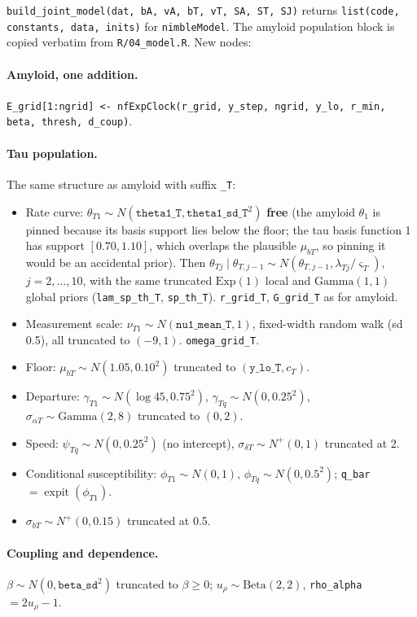 \documentclass[11pt]{article}
\newcommand{\code}[1]{\texttt{#1}}
\newcommand{\expit}{\operatorname{expit}}
\begin{document}
\code{build\_joint\_model(dat, bA, vA, bT, vT, SA, ST, SJ)} returns
\code{list(code, constants, data, inits)} for \code{nimbleModel}. The amyloid
population block is copied verbatim from \code{R/04\_model.R}. New nodes:

\paragraph{Amyloid, one addition.}
\code{E\_grid[1:ngrid] <- nfExpClock(r\_grid, y\_step, ngrid, y\_lo, r\_min, beta, thresh, d\_coup)}.

\paragraph{Tau population.} The same structure as amyloid with suffix \code{\_T}:
\begin{itemize}[nosep]
\item Rate curve: $\theta_{T1}\sim N(\code{theta1\_T},\code{theta1\_sd\_T}^2)$ \textbf{free}
(the amyloid $\theta_1$ is pinned because its basis support lies below the floor;
the tau basis function 1 has support $[0.70,1.10]$, which overlaps the plausible
$\mu_{bT}$, so pinning it would be an accidental prior). Then
$\theta_{Tj}\mid\theta_{T,j-1}\sim N(\theta_{T,j-1},\lambda_{Tj}/\varsigma_T)$, $j=2,\dots,10$,
with the same truncated $\mathrm{Exp}(1)$ local and $\mathrm{Gamma}(1,1)$ global
priors (\code{lam\_sp\_th\_T}, \code{sp\_th\_T}). \code{r\_grid\_T}, \code{G\_grid\_T} as for amyloid.
\item Measurement scale: $\nu_{T1}\sim N(\code{nu1\_mean\_T},1)$, fixed-width random walk
(sd 0.5), all truncated to $(-9,1)$. \code{omega\_grid\_T}.
\item Floor: $\mu_{bT}\sim N(1.05,0.10^2)$ truncated to $(\code{y\_lo\_T},c_T)$.
\item Departure: $\gamma_{T1}\sim N(\log 45,0.75^2)$, $\gamma_{Tq}\sim N(0,0.25^2)$,
$\sigma_{\alpha T}\sim\mathrm{Gamma}(2,8)$ truncated to $(0,2)$.
\item Speed: $\psi_{Tq}\sim N(0,0.25^2)$ (no intercept), $\sigma_{\delta T}\sim N^+(0,1)$ truncated at 2.
\item Conditional susceptibility: $\phi_{T1}\sim N(0,1)$, $\phi_{Tq}\sim N(0,0.5^2)$;
\code{q\_bar} $=\expit(\phi_{T1})$.
\item $\sigma_{bT}\sim N^+(0,0.15)$ truncated at 0.5.
\end{itemize}

\paragraph{Coupling and dependence.}
$\beta\sim N(0,\code{beta\_sd}^2)$ truncated to $\beta\ge0$;
$u_\rho\sim\mathrm{Beta}(2,2)$, \code{rho\_alpha} $=2u_\rho-1$.
\end{document}
